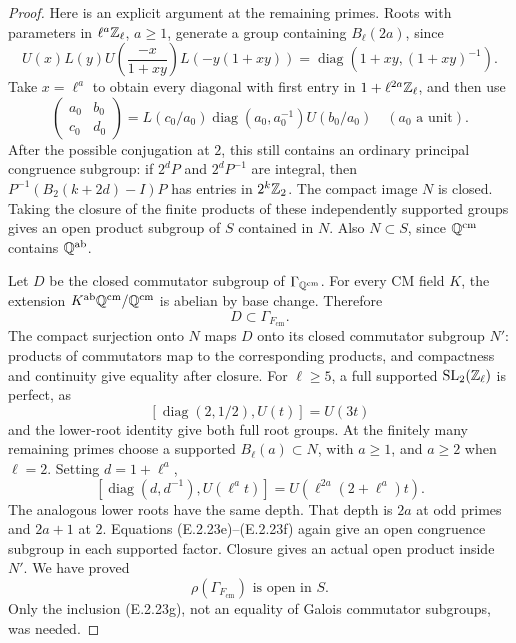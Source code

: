 \begin{proof}
Here is an explicit argument at the remaining primes.
Roots with parameters in \(\ell^a\mathbb Z_\ell\), \(a\geq1\),
generate a group containing \(B_\ell(2a)\), since
\[
 U(x)L(y)U\!\left(\frac{-x}{1+xy}\right)
 L\!\left(-y(1+xy)\right)
       =\operatorname{diag}(1+xy,(1+xy)^{-1}).
 \tag{E.2.23e}
\]
Take \(x=\ell^a\) to obtain every diagonal with first
entry in \(1+\ell^{2a}\mathbb Z_\ell\), and then use
\[
 \begin{pmatrix}a_0&b_0\\c_0&d_0\end{pmatrix}
 =L(c_0/a_0)\operatorname{diag}(a_0,a_0^{-1})U(b_0/a_0)
 \quad(a_0\text{ a unit}).
 \tag{E.2.23f}
\]
After the possible conjugation at \(2\), this still contains
an ordinary principal congruence subgroup: if \(2^dP\)
and \(2^dP^{-1}\) are integral, then
\(P^{-1}(B_2(k+2d)-I)P\) has entries in \(2^k\mathbb Z_2\).
The compact image \(N\) is closed. Taking the closure of
the finite products of these independently supported groups
gives an open product subgroup of \(S\) contained in \(N\).
Also \(N\subset S\), since \(\mathbb Q^{\mathrm{cm}}\)
contains \(\mathbb Q^{\mathrm{ab}}\).

Let \(D\) be the closed commutator subgroup of
\(\Gamma_{\mathbb Q^{\mathrm{cm}}}\). For every CM field \(K\),
the extension \(K^{\mathrm{ab}}\mathbb Q^{\mathrm{cm}}/
\mathbb Q^{\mathrm{cm}}\) is abelian by base change. Therefore
\[
 D\subset\Gamma_{F_{\mathrm{cm}}}.
 \tag{E.2.23g}
\]
The compact surjection onto \(N\) maps \(D\) onto its
closed commutator subgroup \(N'\): products of commutators
map to the corresponding products, and compactness and
continuity give equality after closure.
For \(\ell\geq5\), a full supported
\(\operatorname{SL}_2(\mathbb Z_\ell)\) is perfect, as
\[
 [\operatorname{diag}(2,1/2),U(t)]=U(3t)
\]
and the lower-root identity give both full root groups.
At the finitely many remaining primes choose a supported
\(B_\ell(a)\subset N\), with \(a\geq1\), and
\(a\geq2\) when \(\ell=2\). Setting \(d=1+\ell^a\),
\[
 [\operatorname{diag}(d,d^{-1}),U(\ell^at)]
       =U\!\left(\ell^{2a}(2+\ell^a)t\right).
 \tag{E.2.23h}
\]
The analogous lower roots have the same depth. That depth
is \(2a\) at odd primes and \(2a+1\) at \(2\).
Equations (E.2.23e)--(E.2.23f) again give an open congruence
subgroup in each supported factor. Closure gives an actual
open product inside \(N'\). We have proved
\[
 \rho(\Gamma_{F_{\mathrm{cm}}})
       \text{ is open in }S.
 \tag{E.2.23i}
\]
Only the inclusion (E.2.23g), not an equality of Galois
commutator subgroups, was needed.


\end{proof}
